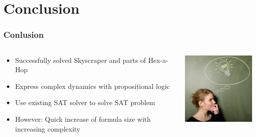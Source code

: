 \section{Conclusion}

\begin{frame}
	\frametitle{Conlusion}
	\begin{columns}
		\begin{column}{6cm}
			\begin{itemize}
				\item Successfully solved Skyscraper and parts of Hex-a-Hop
				\item<2-> Express complex dynamics with propositional logic
				\item<3-> Use existing SAT solver to solve SAT problem
				\item<4-> However: Quick increase of formula size with increasing complexity
			\end{itemize}
		\end{column}
		\begin{column}{5cm}
			\centering
			\includegraphics[width=4.5cm]{images/bulb.jpg}
		\end{column}
	\end{columns}

\end{frame}
